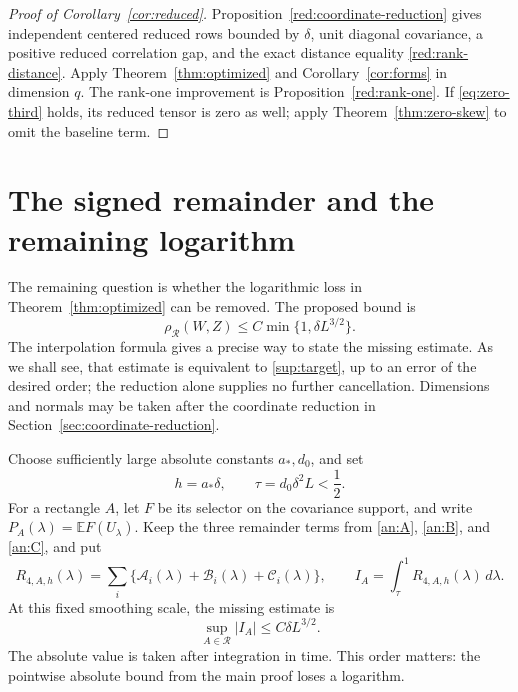 \documentclass[11pt,a4paper]{article}
\theoremstyle{remark}
\newcommand{\E}{\mathbb E}
\newcommand{\cR}{\mathcal R}
\newcommand{\rh}{\rho_{\mathcal R}}
\newcommand{\dd}{\,d}
\begin{document}
\begin{proof}[Proof of Corollary~\ref{cor:reduced}]
Proposition~\ref{red:coordinate-reduction} gives independent centered
reduced rows bounded by \(\delta\), unit diagonal covariance, a positive
reduced correlation gap, and the exact distance equality
\eqref{red:rank-distance}. Apply Theorem~\ref{thm:optimized} and
Corollary~\ref{cor:forms} in dimension \(q\).
The rank-one improvement is Proposition~\ref{red:rank-one}.
If \eqref{eq:zero-third} holds, its reduced tensor is zero as well;
apply Theorem~\ref{thm:zero-skew} to omit the baseline term.
\end{proof}



\section{The signed remainder and the remaining logarithm}
\label{sup:status}

The remaining question is whether the logarithmic loss in
Theorem~\ref{thm:optimized} can be removed. The proposed bound is
\begin{equation}
 \rh(W,Z)\le C\min\{1,\delta L^{3/2}\}.
 \tag{T}\label{sup:target}
\end{equation}
The interpolation formula gives a precise way to state the missing
estimate. As we shall see, that estimate is equivalent to
\eqref{sup:target}, up to an error of the desired order; the reduction
alone supplies no further cancellation. Dimensions and normals may be
taken after the coordinate reduction in
Section~\ref{sec:coordinate-reduction}.

Choose sufficiently large absolute constants \(a_*,d_0\), and set
\[
 h=a_*\delta,\qquad \tau=d_0\delta^2L<\frac12.
\]
For a rectangle \(A\), let \(F\) be its selector on the covariance
support, and write \(P_A(\lambda)=\E F(U_\lambda)\). Keep the three
remainder terms from \eqref{an:A}, \eqref{an:B}, and \eqref{an:C}, and put
\begin{equation}
 R_{4,A,h}(\lambda)=\sum_i
       \{\mathcal A_i(\lambda)+\mathcal B_i(\lambda)+\mathcal C_i(\lambda)\},
 \qquad I_A=\int_\tau^1 R_{4,A,h}(\lambda)\dd\lambda.
 \label{sup:I}
\end{equation}
At this fixed smoothing scale, the missing estimate is
\begin{equation}
 \sup_{A\in\cR}|I_A|\le C\delta L^{3/2}.
 \tag{M}\label{sup:M}
\end{equation}
The absolute value is taken after integration in time. This order
matters: the pointwise absolute bound from the main proof loses a
logarithm.
\end{document}
